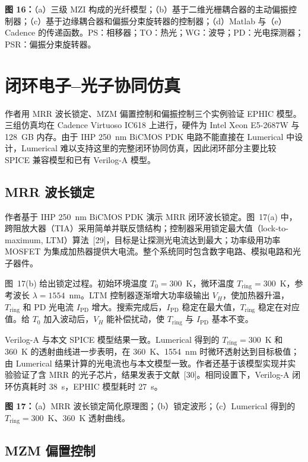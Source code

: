 \documentclass[11pt,a4paper]{ctexart}
\begin{document}
\noindent\textbf{图 16：}（a）三级 MZI 构成的光纤模型；（b）基于二维光栅耦合器的主动偏振控制器；（c）基于边缘耦合器和偏振分束旋转器的控制器；（d）Matlab 与（e）Cadence 的传递函数。PS：相移器；TO：热光；WG：波导；PD：光电探测器；PSR：偏振分束旋转器。

\section{闭环电子--光子协同仿真}

作者用 MRR 波长锁定、MZM 偏置控制和偏振控制三个实例验证 EPHIC 模型。三组仿真均在 Cadence Virtuoso IC618 上进行，硬件为 Intel Xeon E5-2687W 与 128~GB 内存。由于 IHP 250~nm BiCMOS PDK 电路不能直接在 Lumerical 中设计，Lumerical 难以支持这里的完整闭环协同仿真，因此闭环部分主要比较 SPICE 兼容模型和已有 Verilog-A 模型。

\subsection{MRR 波长锁定}

作者基于 IHP 250~nm BiCMOS PDK 演示 MRR 闭环波长锁定。图~17(a) 中，跨阻放大器（TIA）采用简单并联反馈结构；控制器采用锁定最大值（lock-to-maximum, LTM）算法~[29]，目标是让探测光电流达到最大；功率级用功率 MOSFET 为集成加热器提供大电流。整个系统同时包含数字电路、模拟电路和光子器件。

图~17(b) 给出锁定过程。初始环境温度 $T_0=300$~K，微环温度 $T_{\mathrm{ring}}=300$~K，参考波长 $\lambda=1554$~nm。LTM 控制器逐渐增大功率级输出 $V_H$，使加热器升温，$T_{\mathrm{ring}}$ 和 PD 光电流 $I_{\mathrm{PD}}$ 增大。搜索完成后，$I_{\mathrm{PD}}$ 稳定在最大值，$T_{\mathrm{ring}}$ 稳定在对应值。给 $T_0$ 加入波动后，$V_H$ 能补偿扰动，使 $T_{\mathrm{ring}}$ 与 $I_{\mathrm{PD}}$ 基本不变。

Verilog-A 与本文 SPICE 模型结果一致。Lumerical 得到的 $T_{\mathrm{ring}}=300$~K 和 360~K 的透射曲线进一步表明，在 360~K、1554~nm 时微环透射达到目标极值；由 Lumerical 结果计算的光电流也与本文模型一致。作者还基于该模型实现并实验验证了含 MRR 的光子芯片，结果发表于文献~[30]。相同设置下，Verilog-A 闭环仿真耗时 38~s，EPHIC 模型耗时 27~s。

\noindent\textbf{图 17：}（a）MRR 波长锁定简化原理图；（b）锁定波形；（c）Lumerical 得到的 $T_{\mathrm{ring}}=300$~K、360~K 透射曲线。

\subsection{MZM 偏置控制}
\end{document}
